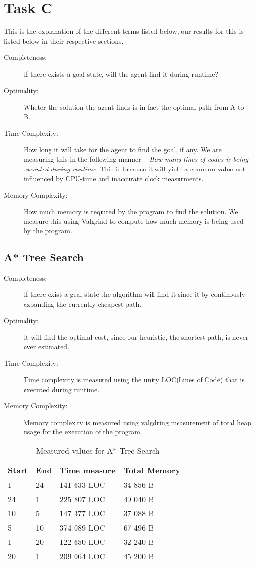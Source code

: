 
\chapter{Task C}
This is the explanation of the different terms listed below, our results for
this is listed below in their respective sections.
\begin{description}
\item[Completeness:			]
	If there exists a goal state, will the agent find it during runtime?
\item[Optimality:				]
	Wheter the solution the agent finds is in fact the optimal path from A to B.
\item[Time Complexity:	]
	How long it will take for the agent to find the goal, if any.  We are
	measuring this in the following manner -- \textit{How many lines of codes is
	being executed during runtime}.  This is because it will yield a common value
	not influenced by CPU-time and inaccurate clock measurments.
\item[Memory Complexity:]
	How much memory is required by the program to find the solution. We measure
	this using Valgrind to compute how much memory is being used by the program.
\end{description}

\section{A* Tree Search}
\begin{description}
\item[Completeness:			]	If there exist a goal state the algorithm will find it
	since it by continously expanding the currently cheapest path.
\item[Optimality:				]	It will find the optimal cost, since our heuristic,
	the shortest path, is never over estimated.
\item[Time Complexity:	]	Time complexity is measured using the unity LOC(Lines
	of Code) that is executed during runtime.
\item[Memory Complexity:]	Memory complexity is measured using valgdring
	measurement of total heap usage for the execution of the program.
\end{description}

\begin{table}[h]
\centering
\begin{tabular}{	p{} p{} 
									p{} p{} 
									p{} }\hline
	Start & End & Time measure & Total Memory \\\hline
	1		&	24 	& 141 633 LOC	&	34 856 B\\
	24	&	1 	& 225 807 LOC	&	49 040 B\\
	10	&	5 	& 147 377 LOC	&	37 088 B\\
	5		&	10 	& 374 089 LOC	&	67 496 B\\
	1		&	20 	& 122 650 LOC	&	32 240 B\\
	20	&	1		&	209 064 LOC	&	45 200 B\\
\end{tabular}
\caption{Measured values for A* Tree Search}\label{tbl:sumTree}
\end{table}

